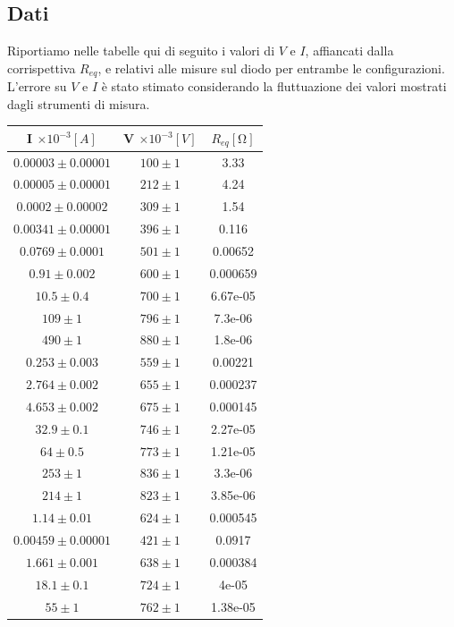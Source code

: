 \documentclass[a4paper]{article}
\begin{document}
\subsection{Dati}
Riportiamo nelle tabelle qui di seguito i valori di \(V\) e \(I\), affiancati dalla corrispettiva \(R_{eq}\), e relativi alle misure sul diodo per entrambe le configurazioni. L'errore su \(V\) e \(I\) è stato stimato considerando la fluttuazione dei valori mostrati dagli strumenti di misura.

\begin{center}
\begin{tabular}{|c|c|c|}
\hline
I $\times 10^{-3}[A]$ & V $\times 10^{-3}[V]$ & $R_{eq} [\si{\ohm}]$\\
\hline
$0.00003 \pm 0.00001$ & $100 \pm 1$ & 3.33 \\
$0.00005 \pm 0.00001$ & $212 \pm 1$ & 4.24 \\
$0.0002 \pm 0.00002$ & $309 \pm 1$ & 1.54 \\
$0.00341 \pm 0.00001$ & $396 \pm 1$ & 0.116 \\
$0.0769 \pm 0.0001$ & $501 \pm 1$ & 0.00652 \\
$0.91 \pm 0.002$ & $600 \pm 1$ & 0.000659 \\
$10.5 \pm 0.4$ & $700 \pm 1$ & 6.67e-05 \\
$109 \pm 1$ & $796 \pm 1$ & 7.3e-06 \\
$490 \pm 1$ & $880 \pm 1$ & 1.8e-06 \\
$0.253 \pm 0.003$ & $559 \pm 1$ & 0.00221 \\
$2.764 \pm 0.002$ & $655 \pm 1$ & 0.000237 \\
$4.653 \pm 0.002$ & $675 \pm 1$ & 0.000145 \\
$32.9 \pm 0.1$ & $746 \pm 1$ & 2.27e-05 \\
$64 \pm 0.5$ & $773 \pm 1$ & 1.21e-05 \\
$253 \pm 1$ & $836 \pm 1$ & 3.3e-06 \\
$214 \pm 1$ & $823 \pm 1$ & 3.85e-06 \\
$1.14 \pm 0.01$ & $624 \pm 1$ & 0.000545 \\
$0.00459 \pm 0.00001$ & $421 \pm 1$ & 0.0917 \\
$1.661 \pm 0.001$ & $638 \pm 1$ & 0.000384 \\
$18.1 \pm 0.1$ & $724 \pm 1$ & 4e-05 \\
$55 \pm 1$ & $762 \pm 1$ & 1.38e-05 \\
\hline
\end{tabular}
\end{center}
\end{document}
